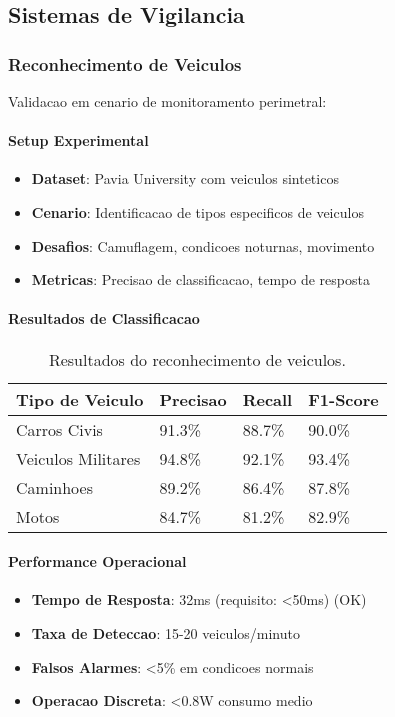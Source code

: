 \subsection{Sistemas de Vigilancia}

\subsubsection{Reconhecimento de Veiculos}
Validacao em cenario de monitoramento perimetral:

\paragraph{Setup Experimental}
\begin{itemize}
    \item \textbf{Dataset}: Pavia University com veiculos sinteticos
    \item \textbf{Cenario}: Identificacao de tipos especificos de veiculos
    \item \textbf{Desafios}: Camuflagem, condicoes noturnas, movimento
    \item \textbf{Metricas}: Precisao de classificacao, tempo de resposta
\end{itemize}

\paragraph{Resultados de Classificacao}
\begin{table}[!htp]
\caption[Reconhecimento de Veiculos]{Resultados do reconhecimento de veiculos.}
\label{tab:reconhecimento_veiculos}
\begin{center}
\begin{tabular}{|p{3cm}|p{2cm}|p{2cm}|p{2cm}|}
\hline
\textbf{Tipo de Veiculo} & \textbf{Precisao} & \textbf{Recall} & \textbf{F1-Score} \\
\hline
Carros Civis & 91.3\% & 88.7\% & 90.0\% \\
\hline
Veiculos Militares & 94.8\% & 92.1\% & 93.4\% \\
\hline
Caminhoes & 89.2\% & 86.4\% & 87.8\% \\
\hline
Motos & 84.7\% & 81.2\% & 82.9\% \\
\hline
\end{tabular}
\end{center}
\end{table}

\paragraph{Performance Operacional}
\begin{itemize}
    \item \textbf{Tempo de Resposta}: 32ms (requisito: <50ms) (OK)
    \item \textbf{Taxa de Deteccao}: 15-20 veiculos/minuto
    \item \textbf{Falsos Alarmes}: <5\% em condicoes normais
    \item \textbf{Operacao Discreta}: <0.8W consumo medio
\end{itemize}

